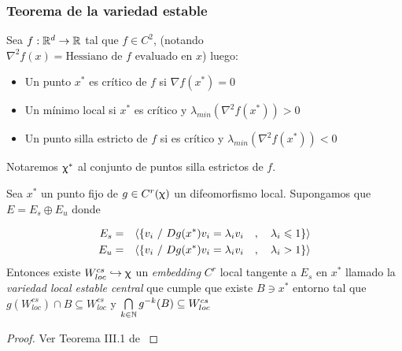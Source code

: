 \subsubsection{Teorema de la variedad estable}

\begin{definition}
	Sea $f : {\mathbb{R}}^d \rightarrow {\mathbb{R}}$ tal que $f \in C^2$, (notando $\nabla^2 f (x) = \text{Hessiano de } f \text{ evaluado en } x$) luego:
	
	\begin{itemize}
		\item Un punto $x^*$ es cr\'itico de $f$  si $\nabla f(x^*) = 0$
		\item Un m\'inimo local si $x^*$ es cr\'itico y $\lambda_{min} \left(\nabla ^2 f(x^*)\right) > 0$
		\item Un punto silla estricto de $f$ si es cr\'itico y $\lambda_{min} \left(\nabla ^2 f(x^*)\right) < 0$ 
	\end{itemize}
	
	Notaremos $\upchi^*$ al conjunto de puntos silla estrictos de $f$.
	
\end{definition}

\begin{theorem}
	\label{teo: variedad local estable central}
	Sea $x^*$ un punto fijo de $g \in C^{r}(\upchi)$ un difeomorfismo local. Supongamos que $E = E_s \oplus E_u$ donde 
	
	\begin{equation*}
	\begin{aligned}
	E_s & = & \langle \left\lbrace v_i \ / \ Dg(x^*)v_i = \lambda_i v_i \quad , \quad \lambda_i \leqslant 1\right\rbrace \rangle \\
	E_u & = & \langle \left\lbrace v_i \ / \ Dg(x^*)v_i = \lambda_i v_i \quad , \quad \lambda_i > 1\right\rbrace \rangle \\
	\end{aligned}
	\end{equation*}
	Entonces existe $W_{loc}^{cs} \hookrightarrow \upchi$ un \textit{embedding} $C^r$ local tangente a $E_s$ en $x^*$ llamado la \textit{variedad local estable central} que cumple que existe $B \ni x^*$ entorno tal que $g\left(W_{loc}^{cs}\right) \cap B \subseteq W_{loc}^{cs}$ y $\bigcap\limits_{k \in {\mathbb{N}}}{g^{-k}(B)} \subseteq W_{loc}^{cs}$
\end{theorem}

\begin{proof}
	Ver Teorema III.1 de \cite{schub:1987}
\end{proof}

